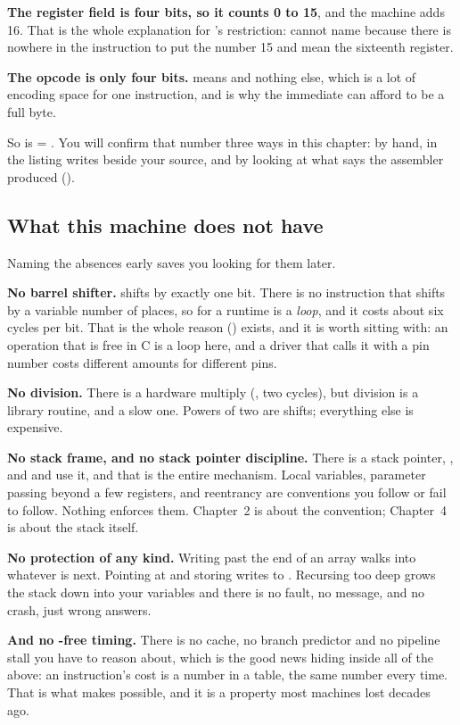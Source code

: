 \textbf{The register field is four bits, so it counts 0 to 15}, and the machine adds 16. That is
the whole explanation for 's restriction:  cannot name 
because there is nowhere in the instruction to put the number 15 and mean the sixteenth register.

\textbf{The opcode is only four bits.}  means  and nothing else, which is a
lot of encoding space for one instruction, and is why the immediate can afford to be a full byte.

So  is  = . You will confirm that
number three ways in this chapter: by hand, in the listing  writes beside your source,
and by looking at what  says the assembler produced ().

\subsection{What this machine does not have}
\label{c1:sec:absent}
Naming the absences early saves you looking for them later.

\textbf{No barrel shifter.}  shifts by exactly one bit. There is no instruction that
shifts by a variable number of places, so  for a runtime  is a \emph{loop},
and it costs about six cycles per bit. That is the whole reason 
() exists, and it is worth sitting with: an operation that is free in C is
a loop here, and a driver that calls it with a pin number costs different amounts for different
pins.

\textbf{No division.} There is a hardware multiply (, two cycles), but division is a
library routine, and a slow one. Powers of two are shifts; everything else is expensive.

\textbf{No stack frame, and no stack pointer discipline.} There is a stack pointer, , and
 and  use it, and that is the entire mechanism. Local variables, parameter
passing beyond a few registers, and reentrancy are conventions you follow or fail to follow.
Nothing enforces them. Chapter~2 is about the convention; Chapter~4 is about the stack itself.

\textbf{No protection of any kind.} Writing past the end of an array walks into whatever is next.
Pointing  at  and storing writes to . Recursing too deep grows the
stack down into your variables and there is no fault, no message, and no crash, just wrong
answers.

\textbf{And no -free timing.} There is no cache, no branch predictor and no pipeline
stall you have to reason about, which is the good news hiding inside all of the above: an
instruction's cost is a number in a table, the same number every time. That is what makes
 possible, and it is a property most machines lost decades ago.

